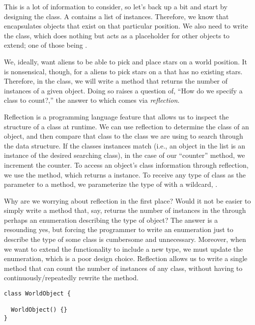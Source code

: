 This is a lot of information to consider, so let's back up a bit and start by designing the  class. A  contains a list of  instances. Therefore, we know that  encapsulates objects that exist on that particular position. We also need to write the  class, which does nothing but acts as a placeholder for other objects to extend; one of those being .

We, ideally, want aliens to be able to pick and place stars on a world position. It is nonsensical, though, for a aliens to pick stars on a  that has no existing stars. Therefore, in the  class, we will write a method that returns the number of instances of a given object. Doing so raises a question of, ``How do we specify a class to count?,'' the answer to which comes via \emph{reflection}. 

Reflection is a programming language feature that allows us to inspect the structure of a class at runtime. We can use reflection to determine the class of an object, and then compare that class to the class we are using to search through the data structure. If the classes instances match (i.e., an object in the list is an instance of the desired searching class), in the case of our ``counter'' method, we increment the counter. To access an object's class information through reflection, we use the  method, which returns a  instance. To receive any type of class as the parameter to a method, we parameterize the type of  with a wildcard, .

Why are we worrying about reflection in the first place? Would it not be easier to simply write a method that, say, returns the number of  instances in the  through perhaps an enumeration describing the type of object? The answer is a resounding yes, but forcing the programmer to write an enumeration just to describe the type of some class is cumbersome and unnecessary. Moreover, when we want to extend the functionality to include a new type, we must update the enumeration, which is a poor design choice. Reflection allows us to write a single method that can count the number of instances of any class, without having to continuously/repeatedly rewrite the method.

\begin{lstlisting}[language=MyJava]
class WorldObject {

  WorldObject() {}
}
\end{lstlisting}

